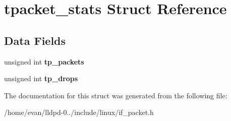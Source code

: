 \section{tpacket\-\_\-stats \-Struct \-Reference}
\label{structtpacket__stats}
\subsection*{\-Data \-Fields}
\begin{DoxyCompactItemize}
\item 
unsigned int {\bfseries tp\-\_\-packets}\label{structtpacket__stats_abc49cf53bec1d6e76abade861fbb1c53}

\item 
unsigned int {\bfseries tp\-\_\-drops}\label{structtpacket__stats_a06956dcd8348161b2e9a0e9291a3115d}

\end{DoxyCompactItemize}


\-The documentation for this struct was generated from the following file\-:\begin{DoxyCompactItemize}
\item 
/home/evan/lldpd-\/0../include/linux/if\-\_\-packet.\-h\end{DoxyCompactItemize}
